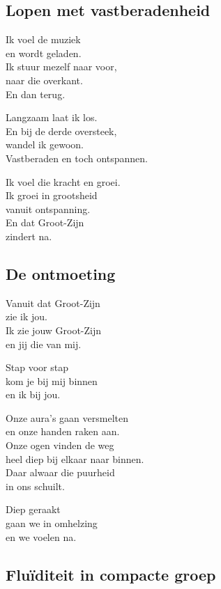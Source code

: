 \documentclass[
  11pt,
]{book}
\begin{document}
\hypertarget{lopen-met-vastberadenheid}{%
\subsection*{Lopen met vastberadenheid}\label{lopen-met-vastberadenheid}}

Ik voel de muziek\\
en wordt geladen.\\
Ik stuur mezelf naar voor,\\
naar die overkant.\\
En dan terug.

Langzaam laat ik los.\\
En bij de derde oversteek,\\
wandel ik gewoon.\\
Vastberaden en toch ontspannen.

Ik voel die kracht en groei.\\
Ik groei in grootsheid\\
vanuit ontspanning.\\
En dat Groot-Zijn\\
zindert na.

\hypertarget{de-ontmoeting}{%
\subsection*{De ontmoeting}\label{de-ontmoeting}}

Vanuit dat Groot-Zijn\\
zie ik jou.\\
Ik zie jouw Groot-Zijn\\
en jij die van mij.

Stap voor stap\\
kom je bij mij binnen\\
en ik bij jou.

Onze aura's gaan versmelten\\
en onze handen raken aan.\\
Onze ogen vinden de weg\\
heel diep bij elkaar naar binnen.\\
Daar alwaar die puurheid\\
in ons schuilt.

Diep geraakt\\
gaan we in omhelzing\\
en we voelen na.

\hypertarget{fluuxefditeit-in-compacte-groep}{%
\subsection*{Fluïditeit in compacte groep}\label{fluuxefditeit-in-compacte-groep}}
\end{document}
